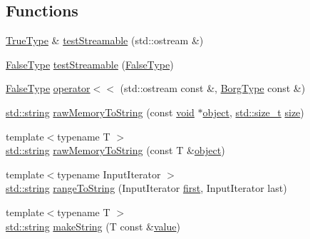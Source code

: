\subsection*{Functions}
\begin{DoxyCompactItemize}
\item 
\hyperlink{struct_catch_1_1_detail_1_1_true_type}{True\+Type} \& \hyperlink{namespace_catch_1_1_detail_aff0ca0f561ad8053654ab27d54486197}{test\+Streamable} (std\+::ostream \&)
\item 
\hyperlink{struct_catch_1_1_detail_1_1_false_type}{False\+Type} \hyperlink{namespace_catch_1_1_detail_aac81f01b0d687f75b8f24a925591b7ac}{test\+Streamable} (\hyperlink{struct_catch_1_1_detail_1_1_false_type}{False\+Type})
\item 
\hyperlink{struct_catch_1_1_detail_1_1_false_type}{False\+Type} \hyperlink{namespace_catch_1_1_detail_ae9a44d574c4fbd18fabaaee05a433d88}{operator$<$$<$} (std\+::ostream const \&, \hyperlink{struct_catch_1_1_detail_1_1_borg_type}{Borg\+Type} const \&)
\item 
\hyperlink{_s_d_l__opengl__glext_8h_ae84541b4f3d8e1ea24ec0f466a8c568b}{std\+::string} \hyperlink{namespace_catch_1_1_detail_ac5d6c510e565ee5bddcc2236194ce29e}{raw\+Memory\+To\+String} (const \hyperlink{_s_d_l__opengles2__gl2ext_8h_ae5d8fa23ad07c48bb609509eae494c95}{void} $\ast$\hyperlink{_s_d_l__opengl__glext_8h_ab49790263c78300fbf05719e38246198}{object}, \hyperlink{_s_d_l__config_8h_a7c94ea6f8948649f8d181ae55911eeaf}{std\+::size\+\_\+t} \hyperlink{_s_d_l__opengl__glext_8h_a3d1e3edfcf61ca2d831883e1afbad89e}{size})
\item 
{\footnotesize template$<$typename T $>$ }\\\hyperlink{_s_d_l__opengl__glext_8h_ae84541b4f3d8e1ea24ec0f466a8c568b}{std\+::string} \hyperlink{namespace_catch_1_1_detail_a371620ed524abfcae5c3772bf49b563a}{raw\+Memory\+To\+String} (const T \&\hyperlink{_s_d_l__opengl__glext_8h_ab49790263c78300fbf05719e38246198}{object})
\item 
{\footnotesize template$<$typename Input\+Iterator $>$ }\\\hyperlink{_s_d_l__opengl__glext_8h_ae84541b4f3d8e1ea24ec0f466a8c568b}{std\+::string} \hyperlink{namespace_catch_1_1_detail_a6650a1dff325bf29962ff15ae73fd972}{range\+To\+String} (Input\+Iterator \hyperlink{_s_d_l__opengl__glext_8h_ada771a798be00a696d20928c9a3371e7}{first}, Input\+Iterator last)
\item 
{\footnotesize template$<$typename T $>$ }\\\hyperlink{_s_d_l__opengl__glext_8h_ae84541b4f3d8e1ea24ec0f466a8c568b}{std\+::string} \hyperlink{namespace_catch_1_1_detail_aef46b4178e08758524d25d1d969a503c}{make\+String} (T const \&\hyperlink{_s_d_l__opengl__glext_8h_a8ad81492d410ff2ac11f754f4042150f}{value})
\end{DoxyCompactItemize}
